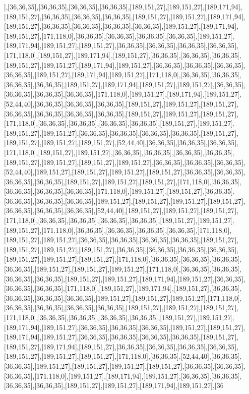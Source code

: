 ],[36,36,35],[36,36,35],[36,36,35],[36,36,35],[189,151,27],[189,151,27],[189,171,94],[189,151,27],[36,36,35],[36,36,35],[36,36,35],[189,151,27],[189,151,27],[189,171,94],[189,151,27],[36,36,35],[36,36,35],[36,36,35],[36,36,35],[189,151,27],[189,171,94],[189,151,27],[171,118,0],[36,36,35],[36,36,35],[36,36,35],[36,36,35],[189,151,27],[189,171,94],[189,151,27],[189,151,27],[36,36,35],[36,36,35],[36,36,35],[36,36,35],[171,118,0],[189,151,27],[189,171,94],[189,151,27],[36,36,35],[36,36,35],[36,36,35],[189,151,27],[189,151,27],[189,171,94],[189,151,27],[36,36,35],[36,36,35],[36,36,35],[36,36,35],[189,151,27],[189,171,94],[189,151,27],[171,118,0],[36,36,35],[36,36,35],[36,36,35],[36,36,35],[189,151,27],[189,171,94],[189,151,27],[189,151,27],[36,36,35],[36,36,35],[36,36,35],[36,36,35],[171,118,0],[189,151,27],[189,171,94],[189,151,27],[52,44,40],[36,36,35],[36,36,35],[36,36,35],[189,151,27],[189,151,27],[189,151,27],[36,36,35],[36,36,35],[36,36,35],[36,36,35],[189,151,27],[189,151,27],[189,151,27],[171,118,0],[36,36,35],[36,36,35],[36,36,35],[36,36,35],[189,151,27],[189,151,27],[189,151,27],[189,151,27],[36,36,35],[36,36,35],[36,36,35],[36,36,35],[189,151,27],[189,151,27],[189,151,27],[189,151,27],[52,44,40],[36,36,35],[36,36,35],[36,36,35],[171,118,0],[189,151,27],[189,151,27],[36,36,35],[36,36,35],[36,36,35],[36,36,35],[189,151,27],[189,151,27],[189,151,27],[189,151,27],[36,36,35],[36,36,35],[36,36,35],[52,44,40],[189,151,27],[189,151,27],[189,151,27],[189,151,27],[36,36,35],[36,36,35],[36,36,35],[36,36,35],[189,151,27],[189,151,27],[189,151,27],[171,118,0],[36,36,35],[36,36,35],[36,36,35],[36,36,35],[171,118,0],[189,151,27],[189,151,27],[36,36,35],[36,36,35],[36,36,35],[36,36,35],[189,151,27],[189,151,27],[189,151,27],[189,151,27],[36,36,35],[36,36,35],[36,36,35],[52,44,40],[189,151,27],[189,151,27],[189,151,27],[171,118,0],[36,36,35],[36,36,35],[36,36,35],[36,36,35],[189,151,27],[189,151,27],[189,151,27],[171,118,0],[36,36,35],[36,36,35],[36,36,35],[36,36,35],[171,118,0],[189,151,27],[189,151,27],[36,36,35],[36,36,35],[36,36,35],[36,36,35],[189,151,27],[189,151,27],[189,151,27],[189,151,27],[36,36,35],[36,36,35],[36,36,35],[36,36,35],[189,151,27],[189,151,27],[189,151,27],[171,118,0],[36,36,35],[36,36,35],[36,36,35],[36,36,35],[189,151,27],[189,151,27],[189,151,27],[171,118,0],[36,36,35],[36,36,35],[36,36,35],[36,36,35],[189,151,27],[189,151,27],[189,171,94],[189,151,27],[36,36,35],[36,36,35],[36,36,35],[171,118,0],[189,151,27],[189,171,94],[189,151,27],[36,36,35],[36,36,35],[36,36,35],[36,36,35],[189,151,27],[189,151,27],[189,151,27],[171,118,0],[36,36,35],[36,36,35],[36,36,35],[36,36,35],[189,151,27],[189,151,27],[189,151,27],[171,118,0],[36,36,35],[36,36,35],[36,36,35],[36,36,35],[189,151,27],[189,151,27],[189,171,94],[189,151,27],[36,36,35],[36,36,35],[36,36,35],[189,151,27],[189,151,27],[189,171,94],[189,151,27],[36,36,35],[36,36,35],[36,36,35],[36,36,35],[189,151,27],[189,151,27],[189,171,94],[189,151,27],[36,36,35],[36,36,35],[36,36,35],[36,36,35],[189,151,27],[189,151,27],[189,151,27],[171,118,0],[36,36,35],[52,44,40],[36,36,35],[36,36,35],[189,151,27],[189,151,27],[189,151,27],[189,151,27],[36,36,35],[36,36,35],[36,36,35],[171,118,0],[189,151,27],[189,171,94],[189,151,27],[36,36,35],[36,36,35],[36,36,35],[36,36,35],[189,151,27],[189,151,27],[189,171,94],[189,151,27],[36
